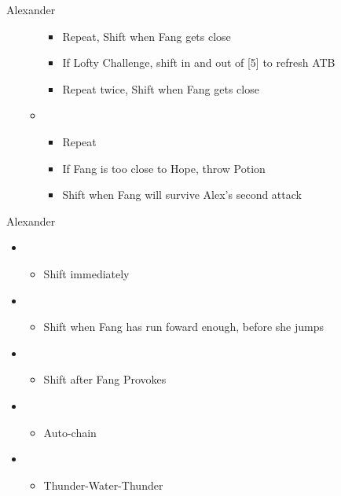 \begin{paracol}{2}
\begin{battle}{Alexander}
\begin{itemize}
\begin{itemize}
				            \begin{itemize}
					            \item Repeat, Shift when Fang gets close
					            \item If Lofty Challenge, shift in and out of [5] to refresh ATB
					            \item Repeat twice, Shift when Fang gets close
				            \end{itemize}
				      \item \first
				            \begin{itemize}
					            \item Repeat
					            \item If Fang is too close to Hope, throw Potion
					            \item Shift when Fang will survive Alex's second attack
				            \end{itemize}
			      \end{itemize}
		\end{itemize}
	\end{battle}
	\switchcolumn
	\begin{battle}{Alexander}
		\begin{itemize}
			\item \first
			      \begin{itemize}
				      \item Shift immediately
			      \end{itemize}
			\item \sixth
			      \begin{itemize}
				      \item Shift when Fang  has run foward enough, before she jumps
			      \end{itemize}
			\item \second
			      \begin{itemize}
				      \item Shift after Fang Provokes
			      \end{itemize}
			\item \first
			      \begin{itemize}
				      \item Auto-chain
			      \end{itemize}
			\item \sixth
			      \begin{itemize}
				      \item Thunder-Water-Thunder
			      \end{itemize}

\end{itemize}
\end{battle}
\end{paracol}
